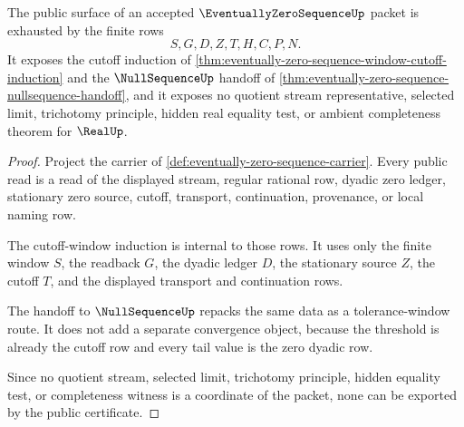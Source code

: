 \begin{theorem}
\label{thm:eventually-zero-sequence-public-certificate}
The public surface of an accepted $\EventuallyZeroSequenceUp$ packet is exhausted by the finite rows
$$
S,G,D,Z,T,H,C,P,N .
$$
It exposes the cutoff induction of \autoref{thm:eventually-zero-sequence-window-cutoff-induction} and the $\NullSequenceUp$ handoff of \autoref{thm:eventually-zero-sequence-nullsequence-handoff}, and it exposes no quotient stream representative, selected limit, trichotomy principle, hidden real equality test, or ambient completeness theorem for $\RealUp$.
\end{theorem}
\begin{proof}
Project the carrier of \autoref{def:eventually-zero-sequence-carrier}. Every public read is a read of the displayed stream, regular rational row, dyadic zero ledger, stationary zero source, cutoff, transport, continuation, provenance, or local naming row.

The cutoff-window induction is internal to those rows. It uses only the finite window $S$, the readback $G$, the dyadic ledger $D$, the stationary source $Z$, the cutoff $T$, and the displayed transport and continuation rows.

The handoff to $\NullSequenceUp$ repacks the same data as a tolerance-window route. It does not add a separate convergence object, because the threshold is already the cutoff row and every tail value is the zero dyadic row.

Since no quotient stream, selected limit, trichotomy principle, hidden equality test, or completeness witness is a coordinate of the packet, none can be exported by the public certificate.
\end{proof}

\begin{closurestatus}{\EventuallyZeroSequenceUp}
  \theoryclosure{\seedClosure}
  \formalstatus{\unformalizedV}
\end{closurestatus}
